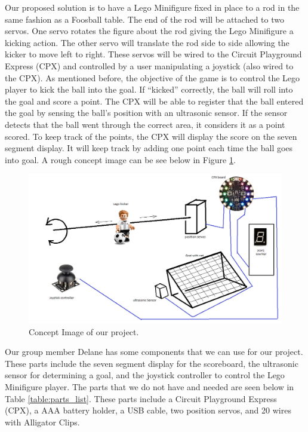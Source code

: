 \documentclass[12pt]{article}
\begin{document}
Our proposed solution is to have a Lego Minifigure fixed in place to a rod in the same fashion as a Foosball table.
The end of the rod will be attached to two servos. One servo rotates the figure about the rod giving the Lego
Minifigure a kicking action. The other servo will translate the rod side to side allowing the kicker to move left to 
right. These servos will be wired to the Circuit Playground Express (CPX) and controlled by a user manipulating a 
joystick (also wired to the CPX). As mentioned before, the objective of the game is to control the Lego player to kick the ball into the 
goal. If ``kicked'' correctly, the ball will roll into the goal and score a point. The CPX will be able to register
that the ball entered the goal by sensing the ball's position with an ultrasonic sensor. If the sensor detects that
the ball went through the correct area, it considers it as a point scored. To keep track of the points, the CPX will 
display the score on the seven segment display. It will keep track by adding one point each time the ball goes into 
goal. A rough concept image can be see below in Figure \ref{fig:concept_image}.

\newpage

\begin{figure}[ht]
\centering
\includegraphics[width=6in]{images/Concept_image.png}
\caption{Concept Image of our project.}
\label{fig:concept_image}
\end{figure}

Our group member Delane has some components that we can use for our project. These parts include the seven segment display for the
scoreboard, the ultrasonic sensor for determining a goal, and the joystick controller to control the Lego Minifigure player.
The parts that we do not have and needed are seen below in Table \ref{table:parts_list}. These parts include a Circuit Playground Express (CPX),
 a AAA battery holder, a USB cable, two position servos, and 20 wires with Alligator Clips.
\end{document}
